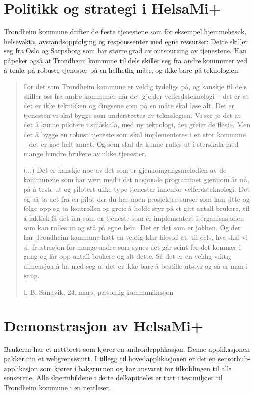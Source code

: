 \section{Politikk og strategi i HelsaMi+}
Trondheim kommune drifter de fleste tjenestene som for eksempel hjemmebesøk, helsevakta, avstandsoppfølging og responssenter med egne ressurser:
Dette skiller seg fra Oslo og Sarpsborg som har større grad av outsourcing av tjenestene. Han påpeker også at Trondheim kommune til dels skiller
seg fra andre kommuner ved å tenke på robuste tjenester på en helhetlig måte, og ikke bare på teknologien:
\blockquote[I. B. Sandvik, 24. mars, personlig kommunikasjon]{For det som Trondheim kommune er
    veldig tydelige på, og kanskje til dels skiller oss fra andre kommuner når det gjelder velferdsteknologi -- det er at det er ikke teknikken og dingsene som på en måte skal
    løse alt. Det er tjenesten vi skal bygge som understøttes av teknologien.
    Vi ser jo det at det å kunne pilotere i småskala, med ny teknologi, det greier de fleste. Men det å bygge en robust tjeneste som skal
    implementeres i en stor kommune
-- det er noe helt annet. Og som skal da kunne rulles ut i storskala med mange hundre brukere av ulike tjenester.

(...) Det er kanskje noe av det som er gjennomgangsmelodien av de kommunene som har vært med i det nasjonale programmet gjennom år nå, på å teste ut
og pilotert ulike type tjenester innenfor velferdsteknologi. Det og så ta det fra en pilot der du har noen prosjektressurser som kan sitte
og følge opp og ta kontrollen og greie å holde styr på
et gitt antall brukere, til å faktisk få det inn som en tjeneste som er implementert i organisasjonen som kan rulles ut og stå på egne bein.
Det er det som er jobben. Og der har Trondheim kommune hatt en veldig klar filosofi at, til dels, hva skal vi si, frustrasjon for mange
andre som synes det går seint før det kommer i gang og får
 opp antall brukere og alt dette. Så det er en veldig viktig dimensjon å ha med seg at det er ikke bare å bestille utstyr og så er man i gang.
 }

\section{Demonstrasjon av HelsaMi+}
Brukeren har et nettbrett som kjører en androidapplikasjon. Denne applikasjonen pakker inn
et webgrensesnitt. I tillegg til hovedapplikasjonen er det en sensorhub-applikasjon som kjører i bakgrunnen
og har ansvaret for tilkoblingen til alle sensorene. Alle skjermbildene i dette delkapittelet er tatt i testmiljøet
til Trondheim kommune i en nettleser.

